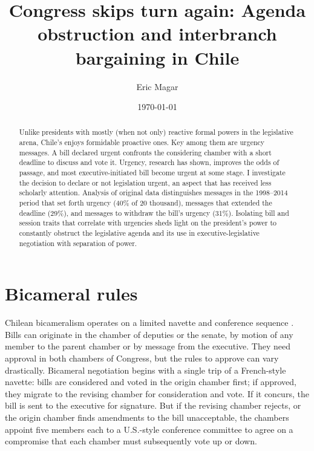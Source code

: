 \documentclass[letter,12pt]{article}
\begin{document}
\title{Congress skips turn again: Agenda obstruction and interbranch bargaining in Chile}
\author{Eric Magar}
\date{\today}
\maketitle

\begin{abstract}
Unlike presidents with mostly (when not only) reactive formal powers in the legislative arena, Chile's enjoys formidable proactive ones. Key among them are urgency messages. A bill declared urgent confronts the considering chamber with a short deadline to discuss and vote it. Urgency, research has shown, improves the odds of passage, and most executive-initiated bill become urgent at some stage. I investigate the decision to declare or not legislation urgent, an aspect that has received less scholarly attention. Analysis of original data distinguishes messages in the 1998--2014 period that set forth urgency (40\% of 20 thousand), messages that extended the deadline (29\%), and messages to withdraw the bill's urgency (31\%). Isolating bill and session traits that correlate with urgencies sheds light on the president's power to constantly obstruct the legislative agenda and its use in executive-legislative negotiation with separation of power.  
\end{abstract}

\onehalfspacing

\section{Bicameral rules}

Chilean bicameralism operates on a limited navette and conference sequence \citep{tsebelis.money.1997,londregan.2000a}. Bills can originate in the chamber of deputies or the senate, by motion of any member to the parent chamber or by message from the executive. They need approval in both chambers of Congress, but the rules to approve can vary drastically. Bicameral negotiation begins with a single trip of a French-style navette: bills are considered and voted in the origin chamber first; if approved, they migrate to the revising chamber for consideration and vote. If it concurs, the bill is sent to the executive for signature. But if the revising chamber rejects, or the origin chamber finds amendments to the bill unacceptable, the chambers appoint five members each to a U.S.-style conference committee to agree on a compromise that each chamber must subsequently vote up or down. 
\end{document}
